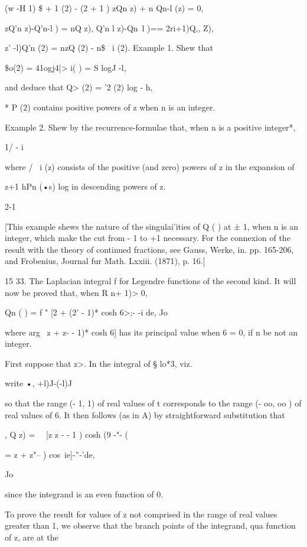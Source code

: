 {{(w -H 1) \$ + 1 (2) - (2 + 1 ) zQn z) + n Qn-l (z) = 0,

zQ'n z)-Q'n-l ) = nQ z), Q'n l z)-Qn~l )== 2ri+1)Q,, Z),

 z' -l)Q'n (2) = nzQ (2) - n\$ \ i (2). Example 1. Shew that

\$o(2) = 41ogj4|> i( ) = S logJ -l,

and deduce that Q> (2) = '2 (2) log - h,

* P (2) contains positive powers of z when n is an integer.

%
%

Example 2. Shew by the recurrence-formulae that, when n is a positive
integer*,

 1/ - i

where / \ i (z) consists of the positive (and zero) powers of z in the
expansion of

z+1 hPn (•s) log in descending powers of z.

2-1

[This example shews the nature of the singulai'ities of Q ( ) at ± 1,
when n is an integer, which make the cut from - 1 to +1 necessary. For
the connexion of the result with the theory of continued fractions,
see Gauss, Werke, in. pp. 165-206, and Frobenius, Journal fur Math.
Lxxiii. (1871), p. 16.]

15 33. The Laplacian integral f for Legendre functions of the second
kind. It will now be proved that, when R n+ 1)> 0,

Qn ( ) = f " [2 + (2' - 1)* cosh 6>;- -i de, Jo

where arg \ z + z- - 1)* cosh 6] has its principal value when 6 = 0,
if n be not an integer.

First suppose that z>. In the integral of § lo*3, viz.

write •, +l)J-(-l)J

so that the range (- 1, 1) of real values of t corresponds to the
range (- oo, oo ) of real values of 6. It then follows (as in
A) by straightforward substitution that

, Q z) = \ \ [z z - - 1 ) cosh (9 -"- (

= z + z"-- ) cos\ ie]-''-'de,

Jo

since the integrand is an even function of 0.

To prove the result for values of z not comprised in the range of real
values greater than 1, we observe that the branch points of the
integrand, qua function of z, are at the

}}
